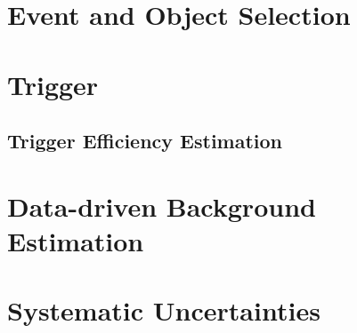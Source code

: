 \section{Event and Object Selection}
\section{Trigger}
\subsection{Trigger Efficiency Estimation}
\section{Data-driven Background Estimation}
\section{Systematic Uncertainties}




